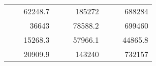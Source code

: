 \begin{table}[H]
\begin{tabular}{|ccrccrccc}
\rowcolor[HTML]{DDFDFF} 
\multicolumn{1}{|c|}{\cellcolor[HTML]{FFFFC7}}                                & \multicolumn{1}{c|}{\cellcolor[HTML]{DDFDFF}}                      & \multicolumn{1}{r|}{\cellcolor[HTML]{DAE8FC}62248.7}   & \multicolumn{1}{c|}{\cellcolor[HTML]{FFFFC7}}                                & \multicolumn{1}{c|}{\cellcolor[HTML]{DDFDFF}}                       & \multicolumn{1}{r|}{\cellcolor[HTML]{DDFDFF}185272}    & \multicolumn{1}{c|}{\cellcolor[HTML]{FFFFC7}}                                & \multicolumn{1}{c|}{\cellcolor[HTML]{DDFDFF}}                      & \multicolumn{1}{r|}{\cellcolor[HTML]{DDFDFF}688284}    \\ \cline{3-3} \cline{6-6} \cline{9-9} 
\multicolumn{1}{|c|}{\cellcolor[HTML]{FFFFC7}}                                & \multicolumn{1}{c|}{\cellcolor[HTML]{DDFDFF}}                      & \multicolumn{1}{r|}{\cellcolor[HTML]{DDFDFF}36643}     & \multicolumn{1}{c|}{\cellcolor[HTML]{FFFFC7}}                                & \multicolumn{1}{c|}{\cellcolor[HTML]{DDFDFF}}                       & \multicolumn{1}{r|}{\cellcolor[HTML]{DAE8FC}78588.2}   & \multicolumn{1}{c|}{\cellcolor[HTML]{FFFFC7}}                                & \multicolumn{1}{c|}{\cellcolor[HTML]{DDFDFF}}                      & \multicolumn{1}{r|}{\cellcolor[HTML]{DAE8FC}699460}    \\ \cline{3-3} \cline{6-6} \cline{9-9} 
\rowcolor[HTML]{DDFDFF} 
\multicolumn{1}{|c|}{\cellcolor[HTML]{FFFFC7}}                                & \multicolumn{1}{c|}{\cellcolor[HTML]{DDFDFF}}                      & \multicolumn{1}{r|}{\cellcolor[HTML]{DAE8FC}15268.3}   & \multicolumn{1}{c|}{\cellcolor[HTML]{FFFFC7}}                                & \multicolumn{1}{c|}{\cellcolor[HTML]{DDFDFF}}                       & \multicolumn{1}{r|}{\cellcolor[HTML]{DDFDFF}57966.1}   & \multicolumn{1}{c|}{\cellcolor[HTML]{FFFFC7}}                                & \multicolumn{1}{c|}{\cellcolor[HTML]{DDFDFF}}                      & \multicolumn{1}{r|}{\cellcolor[HTML]{DDFDFF}44865.8}   \\ \cline{3-3} \cline{6-6} \cline{9-9} 
\multicolumn{1}{|c|}{\cellcolor[HTML]{FFFFC7}}                                & \multicolumn{1}{c|}{\cellcolor[HTML]{DDFDFF}}                      & \multicolumn{1}{r|}{\cellcolor[HTML]{DDFDFF}20909.9}   & \multicolumn{1}{c|}{\cellcolor[HTML]{FFFFC7}}                                & \multicolumn{1}{c|}{\cellcolor[HTML]{DDFDFF}}                       & \multicolumn{1}{r|}{\cellcolor[HTML]{DAE8FC}143240}    & \multicolumn{1}{c|}{\cellcolor[HTML]{FFFFC7}}                                & \multicolumn{1}{c|}{\cellcolor[HTML]{DDFDFF}}                      & \multicolumn{1}{r|}{\cellcolor[HTML]{DAE8FC}732157}    \\ \cline{3-3} \cline{6-6} \cline{9-9} 

\end{tabular}
\end{table}
